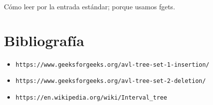 \documentclass[11pt]{article}
\begin{document}
Cómo leer por la entrada estándar; porque usamos fgets.


\section{Bibliografía}
\begin{itemize}
    \item \verb|https://www.geeksforgeeks.org/avl-tree-set-1-insertion/|
    \item \verb|https://www.geeksforgeeks.org/avl-tree-set-2-deletion/|
    \item \verb|https://en.wikipedia.org/wiki/Interval_tree|
\end{itemize}
\end{document}
